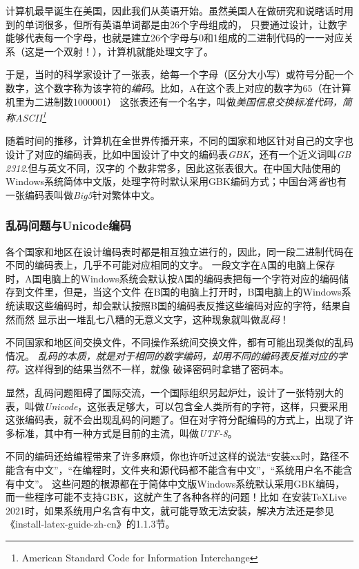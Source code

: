 计算机最早诞生在美国，因此我们从英语开始。虽然美国人在做研究和说瞎话时用到的单词很多，但所有英语单词都是由26个字母组成的，
只要通过设计，让数字能够代表每一个字母，也就是建立26个字母与0和1组成的二进制代码的一一对应关系（这是一个双射！），计算机就能处理文字了。

于是，当时的科学家设计了一张表，给每一个字母（区分大小写）或符号分配一个数字，这个数字称为该字符的\emph{编码}。比如，A在这个表上对应的数字为65（在计算机里为二进制数1000001）
这张表还有一个名字，叫做\emph{美国信息交换标准代码，简称ASCII\footnote{American Standard Code for Information Interchange}}

随着时间的推移，计算机在全世界传播开来，不同的国家和地区针对自己的文字也设计了对应的编码表，比如中国设计了中文的编码表\emph{GBK}，还有一个近义词叫\emph{GB 2312}.但与英文不同，汉字的
个数非常多，因此这张表很大。在中国大陆使用的Windows系统简体中文版，处理字符时默认采用GBK编码方式；中国台湾\emph{省}也有一张编码表叫做\emph{Big5}针对繁体中文。



\subsubsection{乱码问题与Unicode编码}
各个国家和地区在设计编码表时都是相互独立进行的，因此，同一段二进制代码在不同的编码表上，几乎不可能对应相同的文字。
一段文字在A国的电脑上保存时，A国电脑上的Windows系统会默认按A国的编码表把每一个字符对应的编码储存到文件里，但是，当这个文件
在B国的电脑上打开时，B国电脑上的Windows系统读取这些编码时，却会默认按照B国的编码表反推这些编码对应的字符，结果自然而然
显示出一堆乱七八糟的无意义文字，这种现象就叫做\emph{乱码}！

不同国家和地区间交换文件，不同操作系统间交换文件，都有可能出现类似的乱码情况。
\emph{乱码的本质，就是对于相同的数字编码，却用不同的编码表反推对应的字符。}这样得到的结果当然不一样，就像
破译密码时拿错了密码本。

显然，乱码问题阻碍了国际交流，一个国际组织另起炉灶，设计了一张特别大的表，叫做\emph{Unicode}，这张表足够大，可以包含全人类所有的字符，这样，只要采用
这张编码表，就不会出现乱码的问题了。但在对字符分配编码的方式上，出现了许多标准，其中有一种方式是目前的主流，叫做\emph{UTF-8}。

不同的编码还给编程带来了许多麻烦，你也许听过这样的说法“安装xx时，路径不能含有中文”，“在编程时，文件夹和源代码都不能含有中文”，“系统用户名不能含有中文”。
这些问题的根源都在于简体中文版Windows系统默认采用GBK编码，而一些程序可能不支持GBK，这就产生了各种各样的问题！比如
在安装\TeX{}Live 2021时，如果系统用户名含有中文，就可能导致无法安装，解决方法还是参见《install-latex-guide-zh-cn》的1.1.3节。


